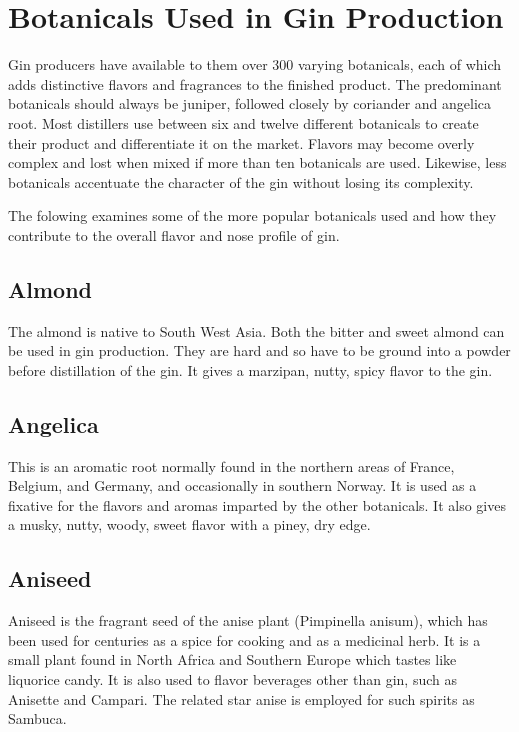 \section{Botanicals Used in Gin Production} 
Gin producers have available to them over 300 varying botanicals, each of which
adds distinctive flavors and fragrances to the finished product. The
predominant botanicals should always be juniper, followed closely by coriander
and angelica root. Most distillers use between six and twelve different
botanicals to create their product and differentiate it on the market. Flavors
may become overly complex and lost when mixed if more than ten botanicals are
used. Likewise, less botanicals accentuate the character of the gin without
losing its complexity.

The folowing examines some of the more popular botanicals used and how they
contribute to the overall flavor and nose profile of gin.

\subsection*{Almond} The almond is native to South West Asia. Both
the bitter and sweet almond can be used in gin production. They are hard and so
have to be ground into a powder before distillation of the gin. It gives a
marzipan, nutty, spicy flavor to the gin.  

\subsection*{Angelica} This is an aromatic root normally found
in the northern areas of France, Belgium, and Germany, and occasionally in
southern Norway. It is used as a fixative for the flavors and aromas imparted
by the other botanicals. It also gives a musky, nutty, woody, sweet flavor with
a piney, dry edge.  

\subsection*{Aniseed} Aniseed is the fragrant seed of the anise
plant (Pimpinella anisum), which has been used for centuries as a spice for
cooking and as a medicinal herb. It is a small plant found in North Africa and
Southern Europe which tastes like liquorice candy. It is also used to flavor
beverages other than gin, such as Anisette and Campari. The related star anise
is employed for such spirits as Sambuca. 

